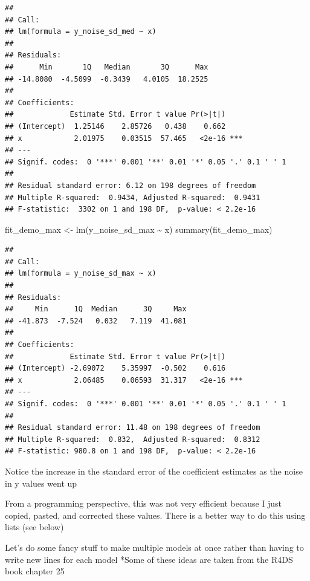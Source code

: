 \documentclass[
]{book}
\newenvironment{Shaded}{\begin{snugshade}}{\end{snugshade}}
\newcommand{\FunctionTok}[1]{\textcolor[rgb]{0.00,0.00,0.00}{#1}}
\newcommand{\NormalTok}[1]{#1}
\newcommand{\OtherTok}[1]{\textcolor[rgb]{0.56,0.35,0.01}{#1}}
\newcommand{\SpecialCharTok}[1]{\textcolor[rgb]{0.00,0.00,0.00}{#1}}
\begin{document}
\begin{verbatim}
## 
## Call:
## lm(formula = y_noise_sd_med ~ x)
## 
## Residuals:
##      Min       1Q   Median       3Q      Max 
## -14.8080  -4.5099  -0.3439   4.0105  18.2525 
## 
## Coefficients:
##             Estimate Std. Error t value Pr(>|t|)    
## (Intercept)  1.25146    2.85726   0.438    0.662    
## x            2.01975    0.03515  57.465   <2e-16 ***
## ---
## Signif. codes:  0 '***' 0.001 '**' 0.01 '*' 0.05 '.' 0.1 ' ' 1
## 
## Residual standard error: 6.12 on 198 degrees of freedom
## Multiple R-squared:  0.9434, Adjusted R-squared:  0.9431 
## F-statistic:  3302 on 1 and 198 DF,  p-value: < 2.2e-16
\end{verbatim}

\begin{Shaded}
\begin{Highlighting}[]
\NormalTok{fit\_demo\_max }\OtherTok{\textless{}{-}} \FunctionTok{lm}\NormalTok{(y\_noise\_sd\_max }\SpecialCharTok{\textasciitilde{}}\NormalTok{ x)}
\FunctionTok{summary}\NormalTok{(fit\_demo\_max)}
\end{Highlighting}
\end{Shaded}

\begin{verbatim}
## 
## Call:
## lm(formula = y_noise_sd_max ~ x)
## 
## Residuals:
##     Min      1Q  Median      3Q     Max 
## -41.873  -7.524   0.032   7.119  41.081 
## 
## Coefficients:
##             Estimate Std. Error t value Pr(>|t|)    
## (Intercept) -2.69072    5.35997  -0.502    0.616    
## x            2.06485    0.06593  31.317   <2e-16 ***
## ---
## Signif. codes:  0 '***' 0.001 '**' 0.01 '*' 0.05 '.' 0.1 ' ' 1
## 
## Residual standard error: 11.48 on 198 degrees of freedom
## Multiple R-squared:  0.832,  Adjusted R-squared:  0.8312 
## F-statistic: 980.8 on 1 and 198 DF,  p-value: < 2.2e-16
\end{verbatim}

Notice the increase in the standard error of the coefficient estimates as the noise in y values went up

From a programming perspective, this was not very efficient because I just copied, pasted, and corrected these values.
There is a better way to do this using lists (see below)

Let's do some fancy stuff to make multiple models at once rather than having to write new lines for each model
*Some of these ideas are taken from the R4DS book chapter 25
\end{document}
